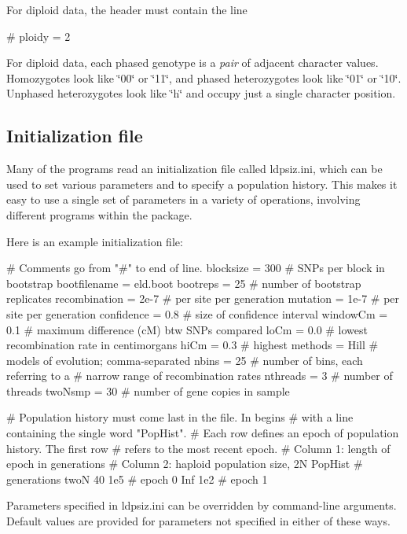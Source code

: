 For diploid data, the header must contain the line \begin{DoxyVerb}# ploidy                = 2
\end{DoxyVerb}


For diploid data, each phased genotype is a {\itshape pair} of adjacent character values. Homozygotes look like \char`\"{}00\char`\"{} or \char`\"{}11\char`\"{}, and phased heterozygotes look like \char`\"{}01\char`\"{} or \char`\"{}10\char`\"{}. Unphased heterozygotes look like \char`\"{}h\char`\"{} and occupy just a single character position.

\subsection*{Initialization file}

Many of the programs read an initialization file called {\ttfamily ldpsiz.\+ini}, which can be used to set various parameters and to specify a population history. This makes it easy to use a single set of parameters in a variety of operations, involving different programs within the package.

Here is an example initialization file\+: \begin{DoxyVerb}# Comments go from "#" to end of line.
blocksize       = 300  # SNPs per block in bootstrap
bootfilename    = eld.boot
bootreps        = 25   # number of bootstrap replicates
recombination   = 2e-7 # per site per generation
mutation        = 1e-7 # per site per generation
confidence      = 0.8  # size of confidence interval
windowCm        = 0.1  # maximum difference (cM) btw SNPs compared
loCm            = 0.0  # lowest recombination rate in centimorgans
hiCm            = 0.3  # highest
methods         = Hill # models of evolution; comma-separated
nbins           = 25   # number of bins, each referring to a 
                       # narrow range of recombination rates
nthreads        = 3    # number of threads
twoNsmp         = 30   # number of gene copies in sample

# Population history must come last in the file. In begins 
# with a line containing the single word "PopHist".
# Each row defines an epoch of population history. The first row
# refers to the most recent epoch.
# Column 1: length of epoch in generations
# Column 2: haploid population size, 2N
PopHist
# generations twoN
           40  1e5   # epoch 0
          Inf  1e2   # epoch 1
\end{DoxyVerb}


Parameters specified in {\ttfamily ldpsiz.\+ini} can be overridden by command-\/line arguments. Default values are provided for parameters not specified in either of these ways.

